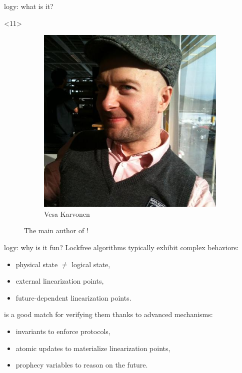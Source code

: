 \begin{frame}[fragile]{\Zoo[]logy: what is it?}
\begin{overbox}<11>
    \begin{figure}
        \begin{subfigure}{0.4\textwidth}
            \includegraphics[scale=0.2]{images/vesa_karvonen.jpg}
            \caption*{\footnotesize Vesa Karvonen}
        \end{subfigure}
        \caption*{The main author of \Kcas!}
    \end{figure}
\end{overbox}


\end{frame}


\begin{frame}{\Zoo[]logy: why is it fun?}
Lockfree algorithms typically exhibit complex behaviors:
\begin{itemize}
    \item physical state $\neq$ logical state,
    \item external linearization points,
    \item future-dependent linearization points.
\end{itemize}
\vfill
\Iris is a good match for verifying them thanks to advanced mechanisms:
\begin{itemize}
    \item invariants to enforce protocols,
    \item atomic updates to materialize linearization points,
    \item prophecy variables to reason on the future.
\end{itemize}
\end{frame}